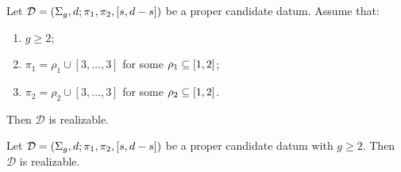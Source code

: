 \documentclass{article}
\begin{document}
\begin{lemma}\label{th:exceptional-n3-special-family}
Let $\mathcal{D}=\left(\Sigma_g,d;\pi_1,\pi_2,[s,d-s]\right)$ be a proper candidate datum. Assume that:
\begin{enumerate}
\item $g\ge 2$;
\item $\pi_1=\rho_1\cup[3,\ldots,3]$ for some $\rho_1\subseteq[1,2]$;
\item $\pi_2=\rho_2\cup[3,\ldots,3]$ for some $\rho_2\subseteq[1,2]$.
\end{enumerate}
Then $\mathcal{D}$ is realizable.
\end{lemma}

\begin{theorem}
Let $\mathcal{D}=\left(\Sigma_g,d;\pi_1,\pi_2,[s,d-s]\right)$ be a proper candidate datum with $g\ge 2$. Then $\mathcal{D}$ is realizable.
\end{theorem}
\end{document}
